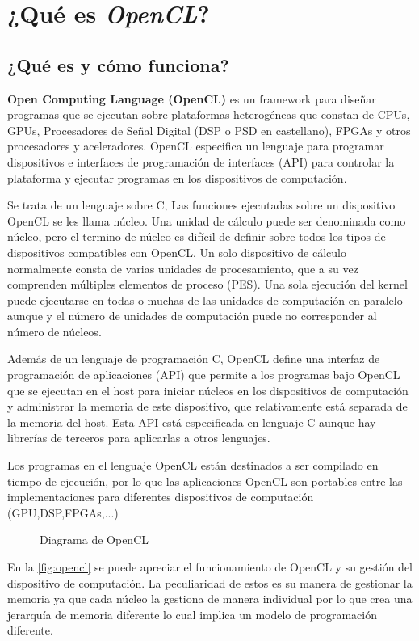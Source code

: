\chapter{¿Qué es \textit{OpenCL}?}

\section{¿Qué es y cómo funciona?}

\textbf{Open Computing Language (OpenCL)} es un framework para diseñar programas que se ejecutan sobre plataformas heterogéneas que constan de CPUs, GPUs, Procesadores de Señal Digital (DSP o PSD en castellano), FPGAs y otros procesadores y aceleradores.
OpenCL especifica un lenguaje para programar dispositivos e interfaces de programación de interfaces (API) para controlar la plataforma y ejecutar programas en los dispositivos de computación.

Se trata de un lenguaje sobre C, Las funciones ejecutadas sobre un dispositivo OpenCL se les llama núcleo. Una unidad de cálculo puede ser denominada como núcleo, pero el termino de núcleo es difícil de definir sobre todos los tipos de dispositivos compatibles con OpenCL.
Un solo dispositivo de cálculo normalmente consta de varias unidades de procesamiento, que a su vez comprenden múltiples elementos de proceso (PES). Una sola ejecución del kernel puede ejecutarse en todas o muchas de las unidades de computación en paralelo aunque y el número de unidades de computación puede no corresponder al número de núcleos.

Además de un lenguaje de programación C, OpenCL define una interfaz de programación de aplicaciones (API) que permite a los programas bajo OpenCL que se ejecutan en el host para iniciar núcleos en los dispositivos de computación y administrar la memoria de este dispositivo, que relativamente está separada de la memoria del host.
Esta API está especificada en lenguaje C aunque hay librerías de terceros para aplicarlas a otros lenguajes.

Los programas en el lenguaje OpenCL están destinados a ser compilado en tiempo de ejecución, por lo que las aplicaciones OpenCL son portables entre las implementaciones para diferentes dispositivos de computación (GPU,DSP,FPGAs,...) 
\begin{figure}
	\centering
	\caption{Diagrama de OpenCL}
	\label{fig:opencl}
\end{figure}

En la \autoref{fig:opencl} se puede apreciar el funcionamiento de OpenCL y su gestión del dispositivo de computación. La peculiaridad de estos es su manera de gestionar la memoria ya que cada núcleo la gestiona de manera individual por lo que crea una jerarquía de memoria diferente lo cual implica un modelo de programación diferente.

